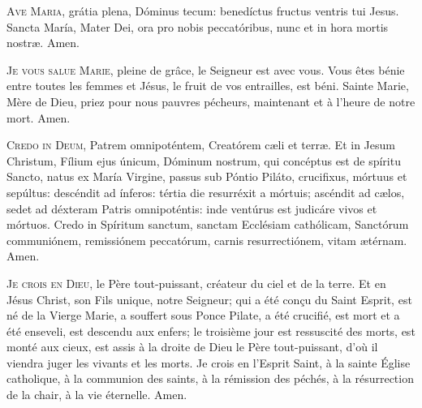 \documentclass[psautier_nocturne_fr.tex]{subfiles}
\begin{document}
\begin{paracol}{2}
\lettrine{A}{ve Maria}, grátia plena, Dóminus tecum: benedíctus fructus ventris tui Jesus. Sancta María, Mater Dei, ora pro nobis 
peccatóribus, nunc et in hora mortis nostræ. Amen.

\switchcolumn

\lettrine{J}{e vous salue Marie}, pleine de grâce, le Seigneur est avec vous.
Vous êtes bénie entre toutes les femmes et Jésus, le fruit de vos entrailles, est béni.
Sainte Marie, Mère de Dieu, priez pour nous pauvres pécheurs, maintenant et à l’heure de notre mort.
Amen.

\switchcolumn*

\lettrine{C}{redo in Deum}, Patrem omnipoténtem, Creatórem cæli et terræ. Et in Jesum Christum, Fílium ejus únicum, Dóminum nostrum,
qui concéptus est de spíritu Sancto, natus ex María Virgine, passus sub Póntio Piláto, crucifixus, mórtuus et sepúltus: descéndit
ad ínferos: tértia die resurréxit a mórtuis; ascéndit ad cælos, sedet ad déxteram Patris omnipoténtis: inde ventúrus est judicáre
vivos et mórtuos. Credo in Spíritum sanctum, sanctam Ecclésiam cathólicam, Sanctórum communiónem, remissiónem peccatórum,
carnis resurrectiónem, vitam ætérnam. Amen.

\switchcolumn

\lettrine{J}{e crois en Dieu}, le Père tout-puissant, créateur du ciel et de la terre.
Et en Jésus Christ, son Fils unique, notre Seigneur;
qui a été conçu du Saint Esprit, est né de la Vierge Marie,
a souffert sous Ponce Pilate, a été crucifié,
est mort et a été enseveli, est descendu aux enfers;
le troisième jour est ressuscité des morts,
est monté aux cieux, est assis à la droite de Dieu le Père tout-puissant,
d’où il viendra juger les vivants et les morts.
Je crois en l’Esprit Saint, à la sainte Église catholique, à la communion des saints,
à la rémission des péchés, à la résurrection de la chair, à la vie éternelle. Amen.

\end{paracol}



\end{document}
